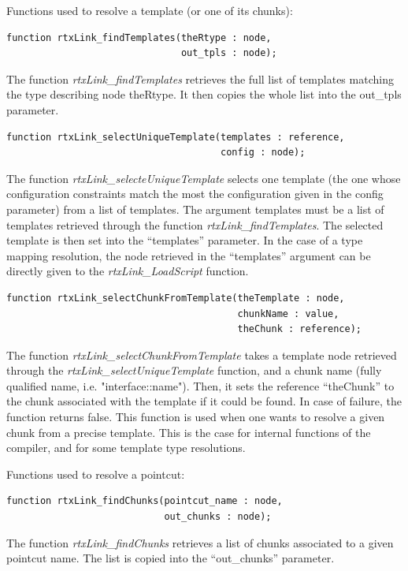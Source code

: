 \documentclass[american]{rtxreport}
\begin{document}
\vspace{20pt}

Functions used to resolve a template (or one of its chunks):
\begin{lstlisting}
function rtxLink_findTemplates(theRtype : node,
                               out_tpls : node);
\end{lstlisting}
The function \emph{rtxLink\_findTemplates} retrieves the full list of templates
matching the type describing node theRtype. It then copies the whole list into
the out\_tpls parameter.

\begin{lstlisting}
function rtxLink_selectUniqueTemplate(templates : reference,
                                      config : node);
\end{lstlisting}
The function \emph{rtxLink\_selecteUniqueTemplate} selects one template (the
one whose configuration constraints match the most the configuration given in
the config parameter) from a list of templates. The argument templates must be
a list of templates retrieved through the function
\emph{rtxLink\_findTemplates}. The selected template is then set into the
``templates'' parameter. In the case of a type mapping resolution, the node
retrieved in the ``templates'' argument can be directly given to the
\emph{rtxLink\_LoadScript} function.

\begin{lstlisting}
function rtxLink_selectChunkFromTemplate(theTemplate : node,
                                         chunkName : value,
                                         theChunk : reference);
\end{lstlisting}
The function \emph{rtxLink\_selectChunkFromTemplate} takes a template node
retrieved through the \emph{rtxLink\_selectUniqueTemplate} function, and a
chunk name (fully qualified name, i.e. "interface::name"). Then, it sets the
reference ``theChunk'' to the chunk associated with the template if it could be
found. In case of failure, the function returns false. This function is used
when one wants to resolve a given chunk from a precise template. This is the
case for internal functions of the compiler, and for some template type
resolutions.

\vspace{20pt}

Functions used to resolve a pointcut:
\begin{lstlisting}
function rtxLink_findChunks(pointcut_name : node,
                            out_chunks : node);
\end{lstlisting}
The function \emph{rtxLink\_findChunks} retrieves a list of chunks associated
to a given pointcut name. The list is copied into the ``out\_chunks''
parameter.
\end{document}
